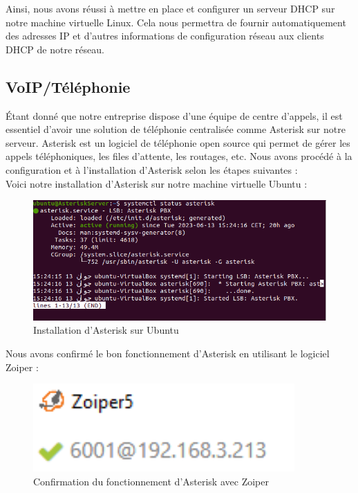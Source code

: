Ainsi, nous avons réussi à mettre en place et configurer un serveur DHCP sur notre machine virtuelle Linux. Cela nous permettra de fournir automatiquement des adresses IP et d'autres informations de configuration réseau aux clients DHCP de notre réseau. \\



\subsection{VoIP/Téléphonie}

Étant donné que notre entreprise dispose d'une équipe de centre d'appels, il est essentiel d'avoir une solution de téléphonie centralisée comme Asterisk sur notre serveur. Asterisk est un logiciel de téléphonie open source qui permet de gérer les appels téléphoniques, les files d'attente, les routages, etc. Nous avons procédé à la configuration et à l'installation d'Asterisk selon les étapes suivantes : \\

Voici notre installation d'Asterisk sur notre machine virtuelle Ubuntu : \\

\begin{figure}[H]
 \centering
    \includegraphics[width=15cm]{Images/AsteriskServer1.png}
    \caption{Installation d'Asterisk sur Ubuntu}
    \label{fig:asterisk-server1}
\end{figure}

Nous avons confirmé le bon fonctionnement d'Asterisk en utilisant le logiciel Zoiper : \\

\begin{figure}[H]
 \centering
    \includegraphics[width=10cm]{Images/AsteriskServer2.png}
    \caption{Confirmation du fonctionnement d'Asterisk avec Zoiper}
    \label{fig:asterisk-server2}
\end{figure}

